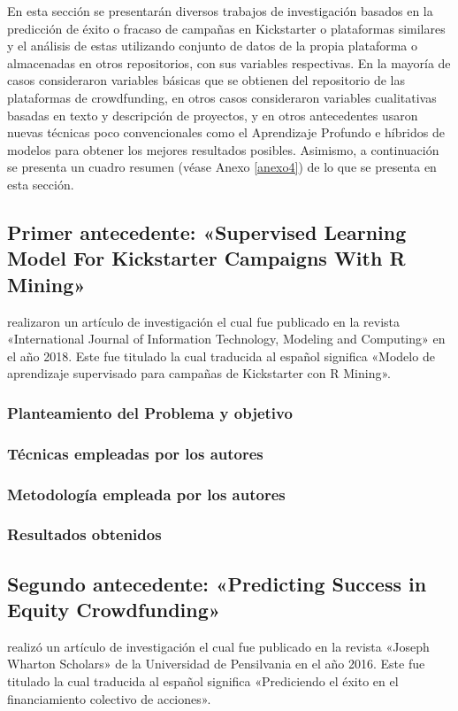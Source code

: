 En esta sección se presentarán diversos trabajos de investigación basados en la predicción de éxito o fracaso de campañas en Kickstarter o plataformas similares y el análisis de estas utilizando conjunto de datos de la propia plataforma o almacenadas en otros repositorios, con sus variables respectivas. En la mayoría de casos consideraron variables básicas que se obtienen del repositorio de las plataformas de crowdfunding, en otros casos consideraron variables cualitativas basadas en texto y descripción de proyectos, y en otros antecedentes usaron nuevas técnicas poco convencionales como el Aprendizaje Profundo e híbridos de modelos para obtener los mejores resultados posibles.
Asimismo, a continuación se presenta un cuadro resumen (véase Anexo \ref{anexo4}) de lo que se presenta en esta sección.

\subsection{Primer antecedente: «Supervised Learning Model For Kickstarter Campaigns With R Mining» \citep*{pr_kamath2018suplearn}}
\citeauthor{pr_kamath2018suplearn} realizaron un artículo de investigación el cual fue publicado en la revista «International Journal of Information Technology, Modeling and Computing» en el año 2018. Este fue titulado  la cual traducida al español significa «Modelo de aprendizaje supervisado para campañas de Kickstarter con R Mining».

\subsubsection{Planteamiento del Problema y objetivo}


\subsubsection{Técnicas empleadas por los autores}
 

\subsubsection{Metodología empleada por los autores}


\subsubsection{Resultados obtenidos}



\subsection{Segundo antecedente: «Predicting Success in Equity Crowdfunding» \citep*{pr_beckwith2016predcrowd}}
\citeauthor{pr_beckwith2016predcrowd} realizó un artículo de investigación el cual fue publicado en la revista «Joseph Wharton Scholars» de la Universidad de Pensilvania en el año 2016. Este fue titulado  la cual traducida al español significa «Prediciendo el éxito en el financiamiento colectivo de acciones».

